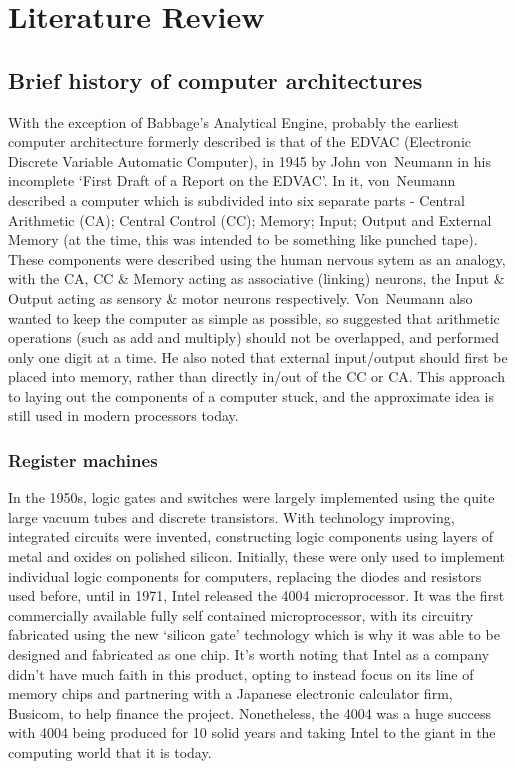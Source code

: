 \chapter{Literature Review}
\section{Brief history of computer architectures}
With the exception of Babbage's Analytical Engine, probably the earliest
computer architecture formerly described is that of the EDVAC (Electronic
Discrete Variable Automatic Computer), in 1945 by John von~Neumann in his
incomplete `First Draft of a Report on the EDVAC'. In it, von~Neumann described
a computer which is subdivided into six separate parts - Central Arithmetic
(CA); Central Control (CC); Memory; Input; Output and External Memory (at the
time, this was intended to be something like punched tape). These components
were described using the human nervous sytem as an analogy, with the CA, CC \&
Memory acting as associative (linking) neurons, the Input \& Output acting as
sensory \& motor neurons respectively.
Von~Neumann also wanted to keep the computer as simple as possible, so suggested
that arithmetic operations (such as add and multiply) should not be overlapped,
and performed only one digit at a time. He also noted that external input/output
should first be placed into memory, rather than directly in/out of the CC or CA.
This approach to laying out the components of a computer stuck, and the
approximate idea is still used in modern processors today.\cite{FirstDraft}

\subsection{Register machines}
In the 1950s, logic gates and switches were largely implemented using the quite
large vacuum tubes and discrete transistors. With technology improving,
integrated circuits were invented, constructing logic components using layers of
metal and oxides on polished silicon. Initially, these were only used to
implement individual logic components for computers, replacing the diodes and
resistors used before, until in 1971, Intel released the 4004 microprocessor.
It was the first commercially available fully self contained microprocessor,
with its circuitry fabricated using the new `silicon gate' technology which is
why it was able to be designed and fabricated as one chip. It's worth noting
that Intel as a company didn't have much faith in this product, opting to
instead focus on its line of memory chips and partnering with a Japanese
electronic calculator firm, Busicom, to help finance the project. Nonetheless,
the 4004 was a huge success with 4004 being produced for 10 solid years and
taking Intel to the giant in the computing world that it is
today.\cite{Aspray1997Intel}

